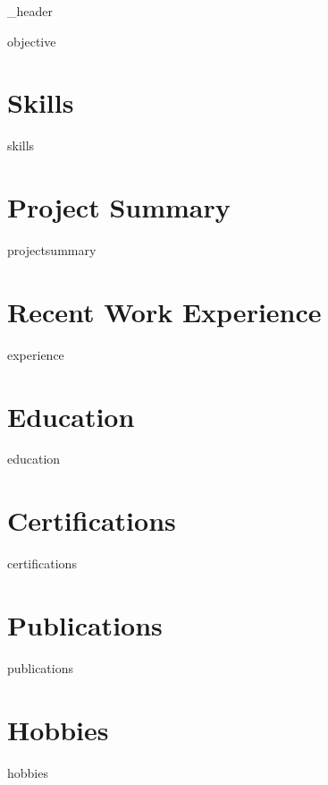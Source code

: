 \documentclass[letter,10pt]{article}
\author{YourName} %
\begin{document}
{_header}

{objective}
\vspace*{7pt}

\section{Skills}
\vspace*{3pt}
{skills}
\vspace*{7pt}

\section{Project Summary}
\vspace*{3pt}
{projectsummary}
\vspace*{7pt}

\section{Recent Work Experience}
{experience}
\vspace*{7pt}

\section{Education}
{education}
\vspace*{7pt}

\section{Certifications}
{certifications}
\vspace*{7pt}

\section{Publications}
{publications}
\vspace*{7pt}

\section{Hobbies}
{hobbies}
\end{document}
